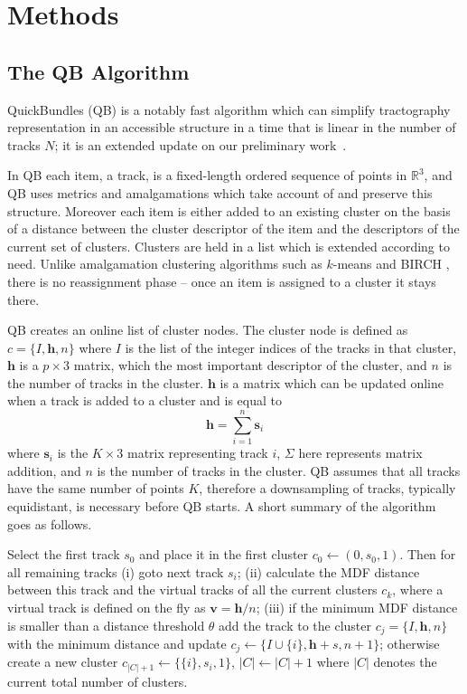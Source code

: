 \documentclass[preprint,authoryear,a4paper,10pt,onecolumn]{elsarticle}
\begin{document}
\section{Methods}

\subsection{The QB Algorithm}

QuickBundles (QB) is a notably fast algorithm which can simplify
tractography representation in an accessible structure in a time that is
linear in the number of tracks $N$; it is an extended update on our
preliminary work~\citep{EGMB10}.

In QB each item, a track, is a fixed-length ordered sequence of points
in $\mathbb{R}^{3}$, and QB uses metrics and amalgamations which take
account of and preserve this structure.  Moreover each item is either
added to an existing cluster on the basis of a distance between the
cluster descriptor of the item and the descriptors of the current set of
clusters. Clusters are held in a list which is extended according to
need. Unlike amalgamation clustering algorithms such as $k$-means
\citep{steinhaus1956division, macqueen1967some} and BIRCH
\citep{zhang1997birch}, there is no reassignment phase -- once an item
is assigned to a cluster it stays there.

QB creates an online list of cluster nodes. The cluster node is defined
as $c=\{I,\mathbf{h},n\}$ where $I$ is the list of the integer indices
of the tracks in that cluster, $\mathbf{h}$ is a $p\times3$ matrix,
which the most important descriptor of the cluster, and $n$ is the
number of tracks in the cluster. $\mathbf{h}$ is a matrix which can be
updated online when a track is added to a cluster and is equal to
\begin{equation}
  \mathbf{h}=\sum_{i=1}^{n}\mathbf{s}_{i}
\end{equation} 
where $\mathbf{s}_{i}$ is the $K\times3$ matrix representing track $i$,
$\Sigma$ here represents matrix addition, and $n$ is the number of
tracks in the cluster. QB assumes that all tracks have the same number
of points $K$, therefore a downsampling of tracks, typically
equidistant, is necessary before QB starts. A short summary of the
algorithm goes as follows.

Select the first track $s_{0}$ and place it in the first cluster
$c_{0}\leftarrow({0},s_{0},1)$. Then for all remaining tracks (i) goto
next track $s_{i}$; (ii) calculate the MDF distance between this track and
the virtual tracks of all the current clusters $c_{k}$, where a virtual track
is defined on the fly as $\mathbf{v}=\mathbf{h}/n$; (iii) if the minimum
MDF distance is smaller than a distance threshold
$\theta$ add the track to the cluster
$c_{j}=\{I,\mathbf{h},n\}$ with the minimum distance and update
$c_{j}\leftarrow\{I\cup\{i\},\mathbf{h}+s,n+1\}$; otherwise create a new
cluster $c_{|C|+1}\leftarrow\{\{i\},s_{i},1\}$, $|C|\leftarrow|C|+1$ where
$|C|$ denotes the current total number of clusters. 
\end{document}
